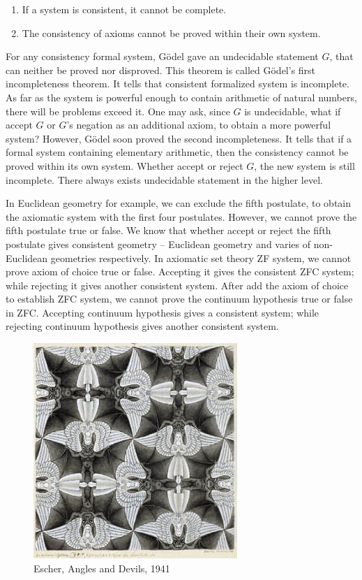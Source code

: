 \documentclass{article}
\begin{document}
\begin{enumerate}
\item If a system is consistent, it cannot be complete.
\item The consistency of axioms cannot be proved within their own system.
\end{enumerate}

For any consistency formal system, Gödel gave an undecidable statement $G$, that can neither be proved nor disproved. This theorem is called Gödel's first incompleteness theorem. It tells that consistent formalized system is incomplete. As far as the system is powerful enough to contain arithmetic of natural numbers, there will be problems exceed it. One may ask, since $G$ is undecidable, what if accept $G$ or $G$'s negation as an additional axiom, to obtain a more powerful system? However, Gödel soon proved the second incompleteness. It tells that if a formal system containing elementary arithmetic, then the consistency cannot be proved within its own system. Whether accept or reject $G$, the new system is still incomplete. There always exists undecidable statement in the higher level.

In Euclidean geometry for example, we can exclude the fifth postulate, to obtain the axiomatic system with the first four postulates. However, we cannot prove the fifth postulate true or false. We know that whether accept or reject the fifth postulate gives consistent geometry -- Euclidean geometry and varies of non-Euclidean geometries respectively. In axiomatic set theory ZF system, we cannot prove axiom of choice true or false. Accepting it gives the consistent ZFC system; while rejecting it gives another consistent system. After add the axiom of choice to establish ZFC system, we cannot prove the continuum hypothesis true or false in ZFC. Accepting continuum hypothesis gives a consistent system; while rejecting continuum hypothesis gives another consistent system.

\begin{figure}[htbp]
 \centering
 \includegraphics[scale=0.5]{img/Angel-Devil-1941.jpg}
 \caption{Escher, Angles and Devils, 1941}
 \label{fig:Angel-Devil-1941}
\end{figure}
\end{document}
